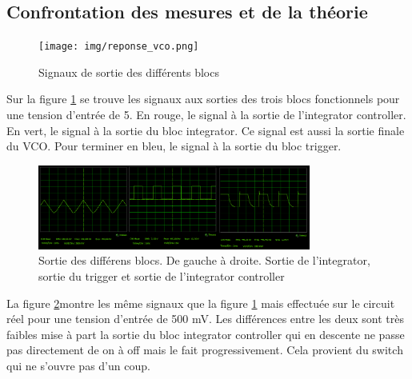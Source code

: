 \subsection{Confrontation  des mesures et de la théorie}
\begin{figure}[ht]
	\centering
	\texttt{[image: img/reponse\_vco.png]}
	\caption{Signaux de sortie des différents blocs}
	\label{fig:out_vco_th}
\end{figure}
Sur la figure \ref{fig:out_vco_th} se trouve les signaux aux sorties des trois blocs fonctionnels pour une tension d'entrée de \unit{5}{\volt}. En rouge, le signal à la sortie de l'integrator controller. En vert, le signal à la sortie du bloc integrator. Ce signal est aussi la sortie finale du VCO. Pour terminer en bleu, le signal à la sortie du bloc trigger.
\begin{figure}[ht]                                       
	\centering
	\includegraphics[width=0.8\textwidth]{img/vco_real_out.png}
	\caption{Sortie des différens blocs. De gauche à droite. Sortie de l'integrator, sortie du trigger et sortie de l'integrator controller}
	\label{fig:out_vco_real}
\end{figure}
La figure \ref{fig:out_vco_real}montre les même signaux que la figure \ref{fig:out_vco_th} mais effectuée sur le circuit réel pour une tension d'entrée de 500 mV. Les différences entre les deux sont très faibles mise à part la sortie du bloc integrator controller qui en descente ne passe pas directement de on à off mais le fait progressivement. Cela provient du switch qui ne s'ouvre pas d'un coup.

